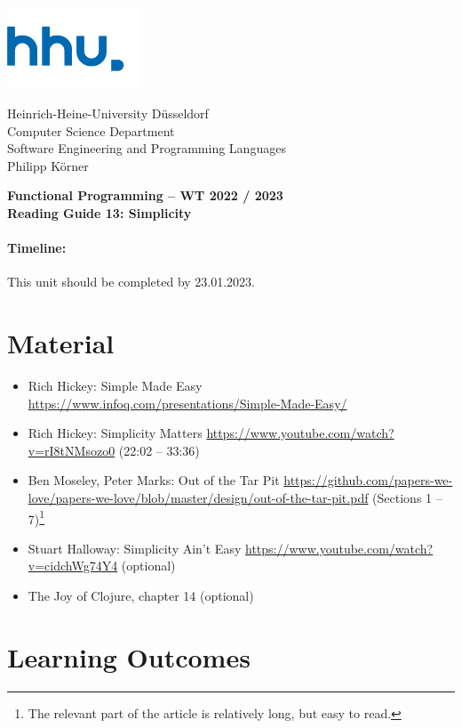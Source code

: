 \documentclass[11pt,a4paper]{article}
\begin{document}
\begin{minipage}[b]{\textwidth}
	\parbox[t]{5cm}{%
		\includegraphics[width=4cm]{unilogo}
		\hfill
	}
	\parbox[b]{11cm}{%
		Heinrich-Heine-University D\"usseldorf\\
		Computer Science Department\\
		Software Engineering and Programming Languages\\
		Philipp K\"orner
	}
\end{minipage}
\begin{center}
	\bf
	Functional Programming -- WT 2022 / 2023\\
	Reading Guide 13: Simplicity
\end{center}

\pagestyle{empty}

\paragraph{Timeline:} This unit should be completed by 23.01.2023.

\section{Material} 

\begin{itemize}
\item Rich Hickey: Simple Made Easy \url{https://www.infoq.com/presentations/Simple-Made-Easy/}
\item Rich Hickey: Simplicity Matters \url{https://www.youtube.com/watch?v=rI8tNMsozo0} (22:02 -- 33:36)
\item Ben Moseley, Peter Marks: Out of the Tar Pit \url{https://github.com/papers-we-love/papers-we-love/blob/master/design/out-of-the-tar-pit.pdf} (Sections 1 -- 7)\footnote{The relevant part of the article is relatively long, but easy to read.}
\item Stuart Halloway: Simplicity Ain't Easy \url{https://www.youtube.com/watch?v=cidchWg74Y4} (optional)
\item The Joy of Clojure, chapter 14 (optional)
\end{itemize}


\section{Learning Outcomes}
\end{document}
